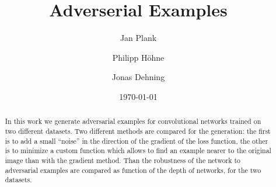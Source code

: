 \documentclass[%
 reprint,
 amsmath,amssymb,
 aps,
]{revtex4-1}
\begin{document}

\title{Adverserial Examples}%

\author{Jan Plank}
\author{Philipp Höhne}%
%


\author{Jonas Dehning}
%

\date{\today}%

\begin{abstract}
In this work we generate adversarial examples for convolutional networks trained on two different datasets. Two different methods are compared for the generation: the first is to add a small ``noise'' in the direction of the gradient of the loss function, the other is to minimize a custom function which allows to find an example nearer to the original image than with the gradient method. Than the robustness of the network to adversarial examples are compared as function of the depth of networks, for the two datasets.


\end{abstract}

\maketitle
\end{document}
